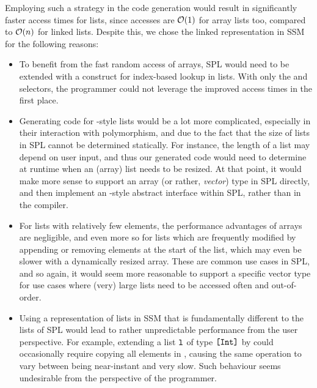 Employing such a strategy in the code generation would result in significantly
faster access times for lists, since accesses are $\mathcal{O}(1)$ for array lists
too, compared to $\mathcal{O}(n)$ for linked lists.
Despite this, we chose the linked representation in SSM for the following reasons:
%
\begin{itemize}
  \item To benefit from the fast random access of arrays, SPL would need to be
        extended with a construct for index-based lookup in lists. With only the
         and  selectors, the programmer could not leverage the
        improved access times in the first place.
  \item Generating code for -style lists would be a lot more
        complicated, especially in their interaction with polymorphism, and due
        to the fact that the size of lists in SPL cannot be determined
        statically. For instance, the length of a list may depend on user input,
        and thus our generated code would need to determine at runtime when an
        (array) list needs to be resized. At that point, it would make more
        sense to support an array (or rather, \emph{vector}) type in SPL
        directly, and then implement an -style abstract
        interface within SPL, rather than in the compiler.
  \item For lists with relatively few elements, the performance advantages of
        arrays are negligible, and even more so for lists which are frequently
        modified by appending or removing elements at the start of the list,
        which may even be slower with a dynamically resized array.
        These are common use cases in SPL, and so again, it would seem more
        reasonable to support a specific vector type for use cases where (very)
        large lists need to be accessed often and out-of-order.
  \item Using a representation of lists in SSM that is fundamentally different
        to the lists of SPL would lead to rather unpredictable performance from
        the user perspective. For example, extending a list
        $\texttt{l}$ of type $\texttt{[}\texttt{Int}\texttt{]}$ by  could occasionally
        require copying all elements in , causing the same operation to
        vary between being near-instant and very slow. Such behaviour seems
        undesirable from the perspective of the programmer.
\end{itemize}

